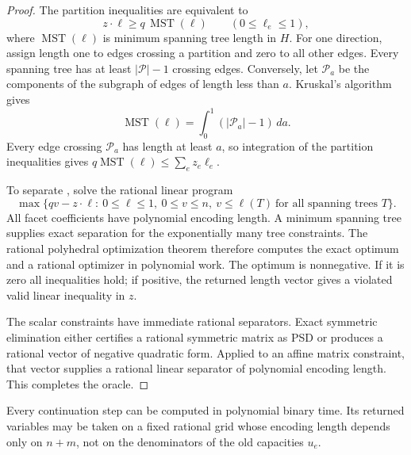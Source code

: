 \begin{proof}
The partition inequalities are equivalent to
\begin{equation}
             z\cdot\ell\ge q\,\operatorname{MST}(\ell)
                      \qquad(0\le\ell_e\le1),
 \label{eq:ta-MST-inequalities}
\end{equation}
where $\operatorname{MST}(\ell)$ is minimum spanning tree length in $H$.
For one direction, assign length one to edges crossing a partition and
zero to all other edges. Every spanning tree has at least
$|\mathcal P|-1$ crossing edges. Conversely, let $\mathcal P_a$ be the
components of the subgraph of edges of length less than $a$.
Kruskal's algorithm gives
\[
 \operatorname{MST}(\ell)=\int_0^1(|\mathcal P_a|-1)\,da.
\]
Every edge crossing $\mathcal P_a$ has length at least $a$, so integration
of the partition inequalities gives
$q\operatorname{MST}(\ell)\le\sum_e z_e\ell_e$.

To separate , solve the rational linear
program
\begin{equation}
 \max\bigl\{qv-z\cdot\ell:\ 0\le\ell\le1,\ 0\le v\le n,
                         \ v\le\ell(T)\ \text{for all spanning trees }T\bigr\}.
 \label{eq:ta-MST-LP}
\end{equation}
All facet coefficients have polynomial encoding length. A minimum
spanning tree supplies exact separation for the exponentially many tree
constraints. The rational polyhedral optimization theorem
\cite[Theorem~6.4.9]{GLS1988} therefore computes the exact optimum and a
rational optimizer in polynomial work. The optimum is nonnegative. If
it is zero all inequalities hold; if positive, the returned length
vector gives a violated valid linear inequality in $z$.

The scalar constraints have immediate rational separators. Exact
symmetric elimination either certifies a rational symmetric matrix as
PSD or produces a rational vector of negative quadratic form. Applied
to an affine matrix constraint, that vector supplies a rational linear
separator of polynomial encoding length. This completes the oracle.
\end{proof}

\begin{lemma}
\label{lem:ta-bits}
Every continuation step can be computed in polynomial binary time.
Its returned variables may be taken on a fixed rational grid whose
encoding length depends only on $n+m$, not on the denominators of the
old capacities $u_e$.
\end{lemma}

